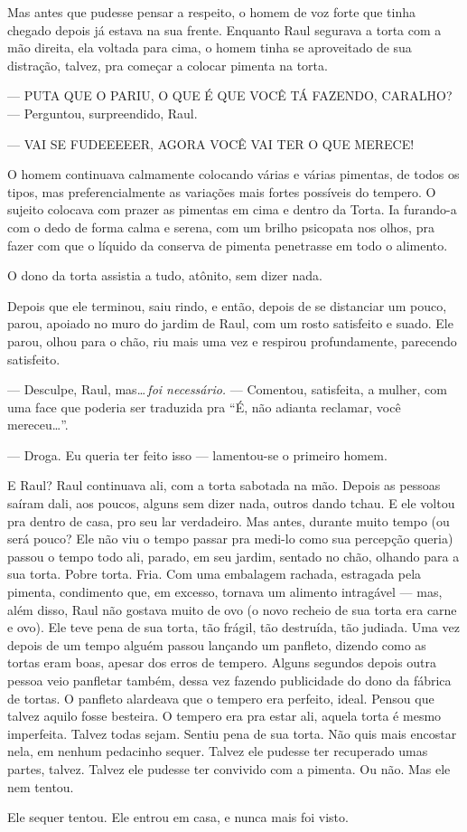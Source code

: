 Mas antes que pudesse pensar a respeito, o homem de voz forte que tinha chegado depois já estava na sua frente. Enquanto Raul segurava a torta com a mão direita, ela voltada para cima, o homem tinha se aproveitado de sua distração, talvez, pra começar a colocar pimenta na torta.

--- PUTA QUE O PARIU, O QUE É QUE VOCÊ TÁ FAZENDO, CARALHO? --- Perguntou, surpreendido, Raul.

--- VAI SE FUDEEEEER, AGORA VOCÊ VAI TER O QUE MERECE!

O homem continuava calmamente colocando várias e várias pimentas, de todos os tipos, mas preferencialmente as variações mais fortes possíveis do tempero. O sujeito colocava com prazer as pimentas em cima e dentro da Torta. Ia furando-a com o dedo de forma calma e serena, com um brilho psicopata nos olhos, pra fazer com que o líquido da conserva de pimenta penetrasse em todo o alimento.

O dono da torta assistia a tudo, atônito, sem dizer nada.

Depois que ele terminou, saiu rindo, e então, depois de se distanciar um pouco, parou, apoiado no muro do jardim de Raul, com um rosto satisfeito e suado. Ele parou, olhou para o chão, riu mais uma vez e respirou profundamente, parecendo satisfeito.

--- Desculpe, Raul, mas\ldots\,\emph{foi necessário.} --- Comentou, satisfeita, a mulher, com uma face que poderia ser traduzida pra ``É, não adianta reclamar, você mereceu\ldots''.

--- Droga. Eu queria ter feito isso --- lamentou-se o primeiro homem.

E Raul? Raul continuava ali, com a torta sabotada na mão. Depois as pessoas saíram dali, aos poucos, alguns sem dizer nada, outros dando tchau. E ele voltou pra dentro de casa, pro seu lar verdadeiro. Mas antes, durante muito tempo (ou será pouco? Ele não viu o tempo passar pra medi-lo como sua percepção queria) passou o tempo todo ali, parado, em seu jardim, sentado no chão, olhando para a sua torta. Pobre torta. Fria. Com uma embalagem rachada, estragada pela pimenta, condimento que, em excesso, tornava um alimento intragável --- mas, além disso, Raul não gostava muito de ovo (o novo recheio de sua torta era carne e ovo). Ele teve pena de sua torta, tão frágil, tão destruída, tão judiada. Uma vez depois de um tempo alguém passou lançando um panfleto, dizendo como as tortas eram boas, apesar dos erros de tempero. Alguns segundos depois outra pessoa veio panfletar também, dessa vez fazendo publicidade do dono da fábrica de tortas. O panfleto alardeava que o tempero era perfeito, ideal. Pensou que talvez aquilo fosse besteira. O tempero era pra estar ali, aquela torta é mesmo imperfeita. Talvez todas sejam. Sentiu pena de sua torta. Não quis mais encostar nela, em nenhum pedacinho sequer. Talvez ele pudesse ter recuperado umas partes, talvez. Talvez ele pudesse ter convivido com a pimenta. Ou não. Mas ele nem tentou.

Ele sequer tentou. Ele entrou em casa, e nunca mais foi visto.
